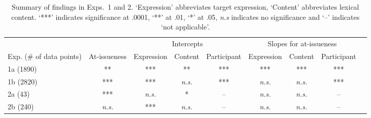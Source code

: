 \documentclass[11pt,fleqn]{article}
\newcommand{\6}{\mbox{$[\hspace*{-.6mm}[$}}
\newcommand{\9}{\mbox{$]\hspace*{-.6mm}]$}}
\begin{document}
\begin{table}[h!]

\begin{center}
\begin{tabular}{p{1.8cm} | c | c c c | c c c c}
\toprule
& & \multicolumn{3}{c|}{Intercepts} & \multicolumn{3}{c}{Slopes for at-issueness}\\
Exp. (\# of data points) & At-issueness & Expression & Content & Participant & Expression & Content & Participant\\
\midrule
1a (1890) & ** & *** & ** & *** & *** & *** & ***  \\ 

1b (2820) & *** & *** & \emph{n.s.} &  *** & \emph{n.s.} & \emph{n.s.} & *** \\ 

2a (43) & *** & \emph{n.s.} & * & -- & \emph{n.s.} & \emph{n.s.} & -- \\ 

2b (240) & \emph{n.s.} & *** & \emph{n.s.} & --& \emph{n.s.} & \emph{n.s.} & -- \\ 
\bottomrule
\end{tabular}
\end{center}
\caption{Summary of findings in Exps.~1 and 2. `Expression' abbreviates target expression, `Content' abbreviates lexical content. `***' indicates significance at .0001, `**' at .01, `*' at .05, \emph{n.s} indicates no significance and `--' indicates `not applicable'.}\label{t-summary}
\end{table}
\end{document}
